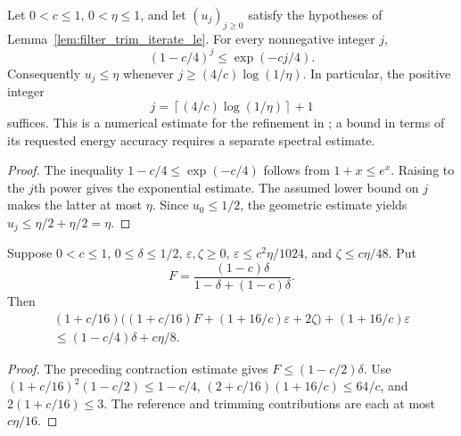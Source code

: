 \begin{lemma}
    \label{lem:filter_trim_logarithmic_count}
    \leanok
    Let $0<c\le1$, $0<\eta\le1$, and let $(u_j)_{j\ge0}$ satisfy the
    hypotheses of Lemma~\ref{lem:filter_trim_iterate_le}. For every
    nonnegative integer $j$,
    \[
        (1-c/4)^j\le \exp(-cj/4).
    \]
    Consequently $u_j\le\eta$ whenever $j\ge(4/c)\log(1/\eta)$.
    In particular, the positive integer
    \[
        j=\left\lceil(4/c)\log(1/\eta)\right\rceil+1
    \]
    suffices. This is a numerical estimate for the refinement in
    \cite[Figure~\texttt{fig:algo1}, lines 1633--1640]{Arad2016RigorousRG};
    a bound in terms of its requested
    energy accuracy requires a separate spectral estimate.
\end{lemma}
\begin{proof}\leanok
    The inequality $1-c/4\le\exp(-c/4)$ follows from $1+x\le e^x$.
    Raising to the $j$th power gives the exponential estimate. The assumed
    lower bound on $j$ makes the latter at most $\eta$. Since $u_0\le1/2$,
    the geometric estimate yields $u_j\le\eta/2+\eta/2=\eta$.
\end{proof}

\begin{lemma}
    \label{lem:reference_filter_trim_error_le}
    \leanok
    Suppose $0<c\le1$, $0\le\delta\le1/2$, $\varepsilon,\zeta\ge0$,
    $\varepsilon\le c^2\eta/1024$, and $\zeta\le c\eta/48$. Put
    \[
        F=\frac{(1-c)\delta}{1-\delta+(1-c)\delta}.
    \]
    Then
    \begin{multline*}
        (1+c/16)\bigl((1+c/16)F+(1+16/c)\varepsilon+2\zeta\bigr)
        +(1+16/c)\varepsilon\\
        \le(1-c/4)\delta+c\eta/8.
    \end{multline*}
\end{lemma}
\begin{proof}\leanok
    The preceding contraction estimate gives $F\le(1-c/2)\delta$.
    Use $(1+c/16)^2(1-c/2)\le1-c/4$,
    $(2+c/16)(1+16/c)\le64/c$, and $2(1+c/16)\le3$.
    The reference and trimming contributions are each at most $c\eta/16$.
\end{proof}

